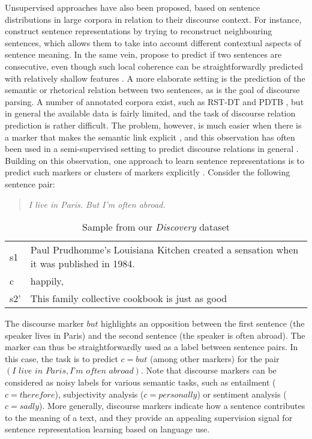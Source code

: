 \documentclass[11pt,a4paper]{article}
\begin{document}
Unsupervised approaches have also been proposed, based on sentence distributions in large corpora in relation to their discourse context.
For instance, \citet{Kiros2015} construct sentence representations by trying to reconstruct neighbouring sentences, which allows them to take into account different contextual aspects of sentence meaning. In the same vein, \citet{Logeswaran2016} propose to predict if two sentences are consecutive, even though such local coherence can be straightforwardly predicted with relatively shallow features \citep{Barzilay2008}.
A more elaborate setting is the prediction of the semantic or rhetorical relation between two sentences, as is the goal of discourse parsing. A number of annotated corpora exist, such as RST-DT \cite{DBLP:conf/sigdial/CarlsonMO01} and PDTB \cite{pdtb2.0}, 
but in general the available data is fairly limited, and the task of discourse relation prediction is rather difficult. The problem, however, is much easier when there is a marker that makes the semantic link explicit \citep{pitler2008}, and this observation has often been used in a semi-supervised setting to predict discourse relations in general \cite{RutherfordX15}. Building on this observation, one approach to learn sentence representations is to predict such markers or clusters of markers explicitly \citep{Jernite2017,Malmi2018,Nie2017}. 
Consider the following sentence pair:
 \begin{quote}
\textit{I live in Paris. But I'm often abroad.}
\end{quote}


\begin{table*}[htb]
\begin{tabular}{l|l}
s1 & Paul Prudhomme's Louisiana Kitchen created a sensation when it was published in 1984.\\
c  & happily,                                                                                                                          \\
s2' & This family collective cookbook is just as good                                                                                  
\end{tabular}
\caption{Sample from our \textit{Discovery} dataset}
\label{tab:sample}
\end{table*}


The discourse marker $\textit{but}$ highlights an opposition between the first sentence (the speaker lives in Paris) and the second sentence (the speaker is often abroad).
The marker can thus be straightforwardly used as a label between sentence pairs. In this case, the task is to predict $c=\textit{but}$ (among other markers) for the pair $(\textit{I live in Paris}, \textit{I'm often abroad})$.
Note that discourse markers can be considered as noisy labels for various semantic tasks, such as entailment ($c=\textit{therefore}$), subjectivity analysis ($c=\textit{personally}$) or sentiment analysis ($c=\textit{sadly}$). 
More generally, discourse markers indicate how a sentence contributes to the meaning of a text, and they provide an appealing supervision signal for sentence representation learning based on language use. 
\end{document}
